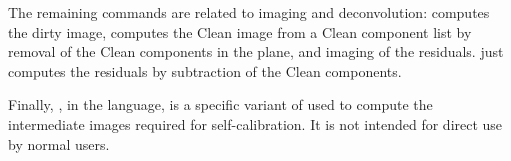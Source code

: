 The remaining  commands are related to imaging and
deconvolution:  computes the dirty image, 
computes the Clean image from a Clean component list by removal
of the Clean components in the \uv{} plane, and imaging of the residuals.
 just computes the residuals by subtraction of the
Clean components. 

Finally, , in the  language, is a specific variant
of  used to compute the intermediate images required for
self-calibration. It is not intended for direct use by normal users.

